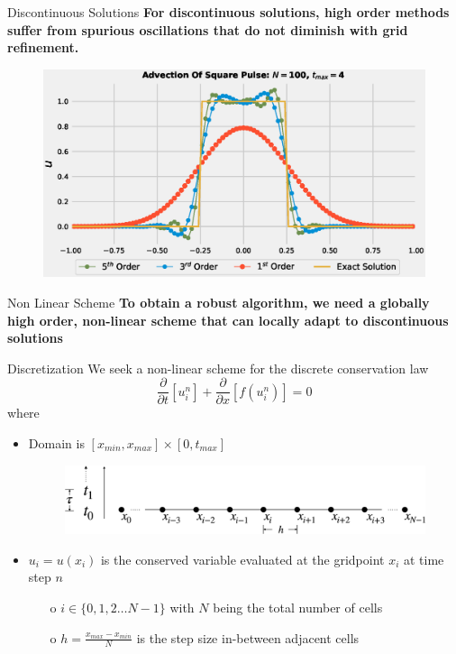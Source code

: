 \documentclass[10pt]{beamer}
\begin{document}
\begin{frame}{Discontinuous Solutions}
  \centering
  \textbf{For discontinuous solutions, high order methods suffer from spurious oscillations that do not diminish with grid refinement.}
  
  \begin{figure}[H]
    \centering
    \includegraphics[scale=0.45]{AdvectionHighOrderComparison_pulse.eps}
    \end{figure}
\end{frame}

\begin{frame}{Non Linear Scheme}
  \textbf{To obtain a robust algorithm, we need a globally high order, non-linear scheme that can locally adapt to discontinuous solutions}
\end{frame}


\begin{frame}{Discretization}
  We seek a non-linear scheme for the discrete conservation law
  \begin{equation}
    \frac{\partial}{\partial t}[u_i^n] + \frac{\partial}{\partial x}[f(u_i^n)] = 0
  \end{equation}
  where 
  \begin{itemize}
    \item Domain is $[x_{min},x_{max}] \times [0,t_{max}]$
    \begin{figure}[H]
      \centering
      \includegraphics[scale=0.175]{GridGraphic_time.png}
    \end{figure}
    \item $u_i = u(x_i)$ is the conserved variable evaluated at the gridpoint $x_i$ at time step $n$
    \begin{itemize}
      \item[o]  $i \in \{0,1,2 \dots N-1\}$ with $N$ being the total number of cells
      \item[o] $h = \frac{x_{max} - x_{min}}{N}$ is the step size in-between adjacent cells
    \end{itemize}
  \end{itemize}
\end{frame}
\end{document}
